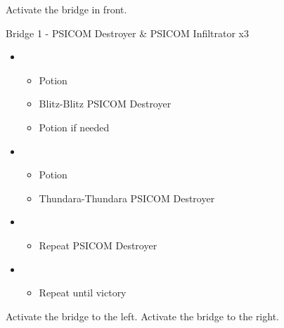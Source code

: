 \documentclass{report}
\begin{document}
Activate the bridge in front.

\begin{battle}{Bridge 1 - PSICOM Destroyer \& PSICOM Infiltrator x3}
\begin{itemize}
    \item \first
    \begin{itemize}
        \item Potion
        \item Blitz-Blitz PSICOM Destroyer
        \item Potion if needed
    \end{itemize}
    \item \fourth
    \begin{itemize}
        \item Potion
        \item Thundara-Thundara PSICOM Destroyer
    \end{itemize}
    \item \first
    \begin{itemize}
        \item Repeat PSICOM Destroyer
    \end{itemize}
    \item \sixth
    \begin{itemize}
        \item Repeat until victory
    \end{itemize}
\end{itemize}
  
\end{battle}

Activate the bridge to the left.  Activate the bridge to the right.
\end{document}
